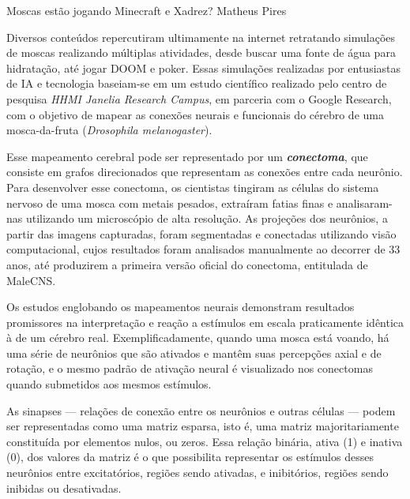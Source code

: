 
\hypearticle
{Moscas estão jogando Minecraft e Xadrez?}
{Matheus Pires}
{

Diversos conteúdos repercutiram ultimamente na internet retratando simulações de moscas realizando múltiplas atividades, desde buscar uma fonte de água para hidratação, até jogar DOOM e poker. Essas simulações realizadas por entusiastas de IA e tecnologia baseiam-se em um estudo científico realizado pelo centro de pesquisa \textit{HHMI Janelia Research Campus}, em parceria com o Google Research, com o objetivo de mapear as conexões neurais e funcionais do cérebro de uma mosca-da-fruta (\textit{Drosophila melanogaster}).

Esse mapeamento cerebral pode ser representado por um \textbf{\textit{conectoma}}, que consiste em grafos direcionados que representam as conexões entre cada neurônio. Para desenvolver esse conectoma, os cientistas tingiram as células do sistema nervoso de uma mosca com metais pesados, extraíram fatias finas e analisaram-nas utilizando um microscópio de alta resolução. As projeções dos neurônios, a partir das imagens capturadas, foram segmentadas e conectadas utilizando visão computacional, cujos resultados foram analisados manualmente ao decorrer de 33 anos, até produzirem a primeira versão oficial do conectoma, entitulada de MaleCNS.

Os estudos englobando os mapeamentos neurais demonstram resultados promissores na interpretação e reação a estímulos em escala praticamente idêntica à de um cérebro real. Exemplificadamente, quando uma mosca está voando, há uma série de neurônios que são ativados e mantêm suas percepções axial e de rotação, e o mesmo padrão de ativação neural é visualizado nos conectomas quando submetidos aos mesmos estímulos.

As sinapses --- relações de conexão entre os neurônios e outras células --- podem ser representadas como uma matriz esparsa, isto é, uma matriz majoritariamente constituída por elementos nulos, ou zeros. Essa relação binária, ativa (1) e inativa (0), dos valores da matriz é o que possibilita representar os estímulos desses neurônios entre excitatórios, regiões sendo ativadas, e inibitórios, regiões sendo inibidas ou desativadas.



}
